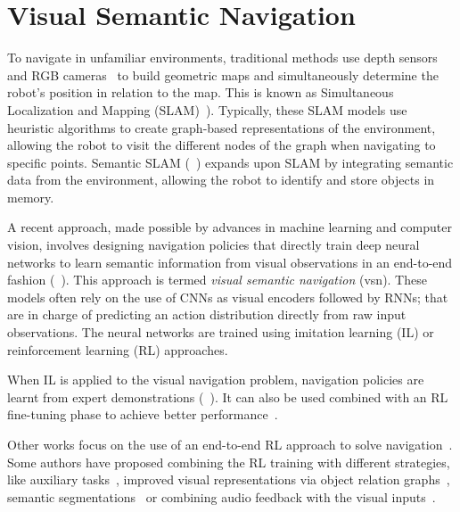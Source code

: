\section{Visual Semantic Navigation}\label{sec:visual-semantic-navigation}

To navigate in unfamiliar environments, traditional methods use depth sensors~\cite{newcombe2011, thrun2001} and RGB cameras~\cite{jones2011, sattler2018} to build geometric maps and simultaneously determine the robot's position in relation to the map.
This is known as Simultaneous Localization and Mapping (SLAM)~\cite{Kazerouni2022, campos2021, labbe2022}).
Typically, these SLAM models use heuristic algorithms to create graph-based representations of the environment, allowing the robot to visit the different nodes of the graph when navigating to specific points.
Semantic SLAM (\eg~\cite{zhang2018, rosinol2020, jin2023}) expands upon SLAM by integrating semantic data from the environment, allowing the robot to identify and store objects in memory.

A recent approach, made possible by advances in machine learning and computer vision, involves designing navigation policies that directly train deep neural networks to learn semantic information from visual observations in an end-to-end fashion (\eg~\cite{ramrakhya2022,yadav2022, gutierrez2019, khandelwal2022, chaplot2020,chang2020}).
This approach is termed \textit{visual semantic navigation} (\acrshort{vsn}).
These models often rely on the use of CNNs as visual encoders followed by RNNs; that are in charge of predicting an action distribution directly from raw input observations.
The neural networks are trained using imitation learning (IL) or reinforcement learning (RL) approaches.

When IL is applied to the visual navigation problem, navigation policies are learnt from expert demonstrations (\eg~\cite{ramrakhya2022,yadav2022}).
It can also be used combined with an RL fine-tuning phase to achieve better performance~\cite{ramrakhya2023}.

Other works focus on the use of an end-to-end RL approach to solve \objnav navigation~\cite{zhu2017, gutierrez2019, wijmans2020, khandelwal2022, Liu2022, Yadav2023OVRLV2AS, Xu2024DeepRL, YokoyamaHM3DOVONAD}.
Some authors have proposed combining the RL training with different strategies, like auxiliary tasks~\cite{ye2021}, improved visual representations via object relation graphs~\cite{yang2018}, semantic segmentations~\cite{Mousavian2018} or combining audio feedback with the visual inputs~\cite{Wang2023, Kondoh2023MultigoalAN}.

